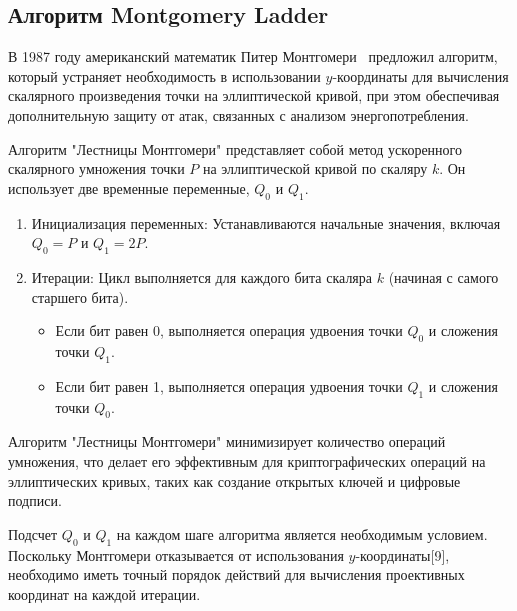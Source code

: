 \subsection*{Алгоритм Montgomery Ladder}

В 1987 году американский математик Питер Монтгомери~\cite{montgomery-curve} предложил алгоритм, который устраняет необходимость в использовании $y$-координаты для вычисления скалярного произведения точки на эллиптической кривой, при этом обеспечивая дополнительную защиту от атак, связанных с анализом энергопотребления.

Алгоритм "Лестницы Монтгомери" представляет собой метод ускоренного скалярного умножения точки $P$ на эллиптической кривой по скаляру $k$. Он использует две временные переменные, $Q_0$ и $Q_1$. 


\begin{enumerate}
    \item Инициализация переменных: Устанавливаются начальные значения, включая $Q_0 = P$ и $Q_1 = 2P$.
    \item Итерации: Цикл выполняется для каждого бита скаляра $k$ (начиная с самого старшего бита).
        \begin{itemize}
            \item Если бит равен 0, выполняется операция удвоения точки $Q_0$ и сложения точки $Q_1$.
            \item Если бит равен 1, выполняется операция удвоения точки $Q_1$ и сложения точки $Q_0$.
        \end{itemize}
\end{enumerate}

Алгоритм "Лестницы Монтгомери" минимизирует количество операций умножения, что делает его эффективным для криптографических операций на эллиптических кривых, таких как создание открытых ключей и цифровые подписи.

Подсчет $Q_0$ и $Q_1$ на каждом шаге алгоритма является необходимым условием. Поскольку Монтгомери отказывается от использования $y$-координаты[9], необходимо иметь точный порядок действий для вычисления проективных координат на каждой итерации.